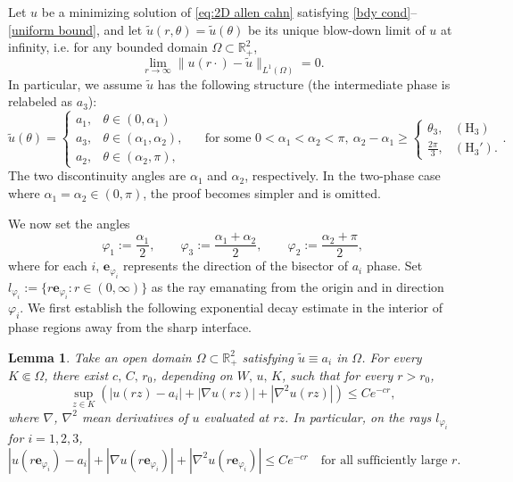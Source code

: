 \documentclass[leqno,11pt]{amsart}
\let\al=\alpha
\let\f=\frac
\let\Om=\Omega
\let\na=\nabla
\newtheorem{lemma}[theorem]{Lemma}
\theoremstyle{remark}
\newcommand{\BR}{\mathbb{R}}
\newcommand{\tu}{\tilde{u}}
\begin{document}
Let $u$ be a minimizing solution of \eqref{eq:2D allen cahn} satisfying \eqref{bdy cond}--\eqref{uniform bound}, and let $\tilde{u}(r,\theta)=\tilde{u}(\theta)$ be its unique blow-down limit of $u$ at infinity, i.e. for any bounded domain $\Om\subset \BR_+^2$,
\[
\lim\limits_{r\to\infty} \|u(r\cdot)-\tu\|_{L^1(\Om)}=0.
\]
In particular, we assume $\tilde{u}$ has the following structure (the intermediate phase is relabeled as $a_3$):
\begin{equation}\label{particular hatu}
    \tilde{u}(\theta)=\begin{cases}
    a_1, & \theta\in(0,\al_1)\\
    a_3, & \theta\in(\al_1,\al_2),\\
    a_2, & \theta\in(\al_2,\pi),
    \end{cases}
    \quad\text{ for some }0<\al_1< \al_2< \pi,\ \al_2-\al_1\geq \begin{cases}
        \theta_3,& (\mathrm{H}_3)\\
        \f{2\pi}{3}, & (\mathrm{H}_3').
    \end{cases}.
\end{equation}
The two discontinuity angles are $\alpha_1$ and $\alpha_2$, respectively. In the two-phase case where $\alpha_1 = \alpha_2 \in (0, \pi)$, the proof becomes simpler and is omitted. 

We now set the angles
\begin{equation}\label{def:theta i}
    \varphi_1:=\f{\al_1}{2}, \qquad \varphi_3:=\f{\al_1+\al_2}{2},\qquad \varphi_2:= \f{\al_2+\pi}{2},
\end{equation}
where for each $i$, $\mathbf{e}_{\varphi_i}$ represents the direction of the bisector of $a_i$ phase. Set $l_{\varphi_i}:=\{r\mathbf{e}_{\varphi_i}:r\in(0,\infty)\}$ as the ray emanating from the origin and in direction $\varphi_i$. We first establish the following exponential decay estimate in the interior of phase regions away from the sharp interface.

\begin{lemma}
    \label{lem:exponential decay phase}
    Take an open domain $\Om\subset\BR_+^2$ satisfying $\tu\equiv a_i$ in $\Om$. For every $K\Subset \Om$, there exist $c,\, C,\, r_0$, depending on $W,\,u,\,K$, such that for every $r>r_0$,
    \begin{equation}
        \label{exp decay compact set}
        \sup_{z\in K} \left( |u(rz)-a_i|+|\na u(rz)|+|\na^2 u(rz)| \right)\leq Ce^{-cr},
    \end{equation}
    where $\na$, $\na^2$ mean derivatives of $u$ evaluated at $rz$. In particular, on the rays $l_{\varphi_i}$ for $i=1,2,3$, 
    \begin{equation}\label{exp decay theta i}
        |u(r\mathbf{e}_{\varphi_i})-a_i|+|\na u(r\mathbf{e}_{\varphi_i})|+|\na^2 u(r\mathbf{e}_{\varphi_i})|\leq Ce^{-cr}\quad\text{for all sufficiently large }r. 
    \end{equation}
\end{lemma}
\end{document}
